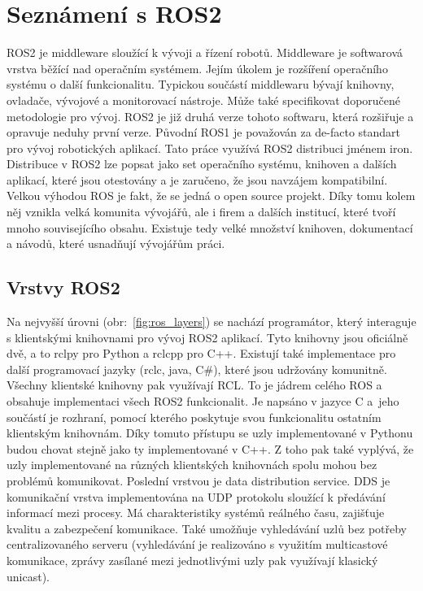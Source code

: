 \section{Seznámení s ROS2}
ROS2 je middleware sloužící k vývoji a řízení robotů. Middleware je softwarová vrstva běžící nad operačním systémem. Jejím úkolem je rozšíření operačního systému o další funkcionalitu. Typickou součástí middlewaru bývají knihovny, ovladače, vývojové a monitorovací nástroje. Může také specifikovat doporučené metodologie pro vývoj. ROS2 je již druhá verze tohoto softwaru, která rozšiřuje a opravuje neduhy první verze. Původní ROS1 je považován za de-facto standart pro vývoj robotických aplikací.
Tato práce využívá ROS2 distribuci jménem iron. Distribuce v ROS2 lze popsat jako set operačního systému, knihoven a dalších aplikací, které jsou otestovány a je zaručeno, že jsou navzájem kompatibilní. Velkou výhodou ROS je fakt, že se jedná o open source projekt. Díky tomu kolem něj vznikla velká komunita vývojářů, ale i firem a dalších institucí, které tvoří mnoho souvisejícího obsahu. Existuje tedy velké množství knihoven, dokumentací a návodů, které usnadňují vývojářům práci. \cite[str:~1-5]{ros2_introduction}

\subsection*{Vrstvy ROS2}
Na nejvyšší úrovni (obr:~\ref{fig:ros_layers}) se nachází programátor, který interaguje s klientskými knihovnami pro vývoj ROS2 aplikací. Tyto knihovny jsou oficiálně dvě, a to rclpy pro Python a rclcpp pro C++. Existují také implementace pro další programovací jazyky (rclc, java, C\#), které jsou udržovány komunitně. Všechny klientské knihovny pak využívají RCL. To je jádrem celého ROS a obsahuje implementaci všech ROS2 funkcionalit. Je napsáno v jazyce C a~jeho součástí je rozhraní, pomocí kterého poskytuje svou funkcionalitu ostatním klientským knihovnám. Díky tomuto přístupu se uzly implementované v Pythonu budou chovat stejně jako ty implementované v C++. Z toho pak také vyplývá, že uzly implementované na různých klientských knihovnách spolu mohou bez problémů komunikovat.
Poslední vrstvou je data distribution service. DDS je komunikační vrstva implementována na UDP protokolu sloužící k předávání informací mezi procesy. Má charakteristiky systémů reálného času, zajišťuje kvalitu a zabezpečení komunikace. Také umožňuje vyhledávání uzlů bez potřeby centralizovaného serveru (vyhledávání je realizováno s využitím multicastové komunikace, zprávy zasílané mezi jednotlivými uzly pak využívají klasický unicast). \cite[str:~13-15]{ros2_introduction}

